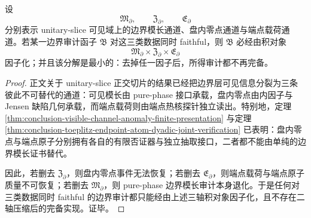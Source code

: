 \begin{theorem}\label{thm:conclusion-unitary-slice-boundary-three-axis-irreducibility}
设
\[
\mathfrak M_{\partial},
\qquad
\mathfrak Z_{\partial},
\qquad
\mathfrak E_{\partial}
\]
分别表示 unitary-slice 可见域上的边界模长通道、盘内零点通道与端点载荷通道。若某一边界审计函子 \(\mathfrak B\) 对这三类数据同时 faithful，则 \(\mathfrak B\) 必经由积对象
\[
\mathfrak M_{\partial}\times \mathfrak Z_{\partial}\times \mathfrak E_{\partial}
\]
因子化；并且该分解是最小的：去掉任一因子后，所得审计都不再完备。
\end{theorem}
\begin{proof}
正文关于 unitary-slice 正交切片的结果已经把边界层可见信息分裂为三条彼此不可替代的通道：可见模长由 pure-phase 接口承载，盘内零点由内因子与 Jensen 缺陷几何承载，而端点载荷则由端点热核探针独立读出。特别地，定理 \ref{thm:conclusion-visible-channel-anomaly-finite-presentation} 与定理 \ref{thm:conclusion-toeplitz-endpoint-atom-dyadic-joint-verification} 已表明：盘内零点与端点原子分别拥有各自的有限否证器与独立抽取接口，二者都不能由单纯的边界模长证书替代。

因此，若删去 \(\mathfrak Z_{\partial}\)，则盘内零点事件无法恢复；若删去 \(\mathfrak E_{\partial}\)，则端点载荷与端点原子质量不可恢复；若删去 \(\mathfrak M_{\partial}\)，则 pure-phase 边界模长审计本身退化。于是任何对三类数据同时 faithful 的边界审计都只能经由上述三轴积对象因子化，且不存在二轴压缩后的完备实现。证毕。
\end{proof}
